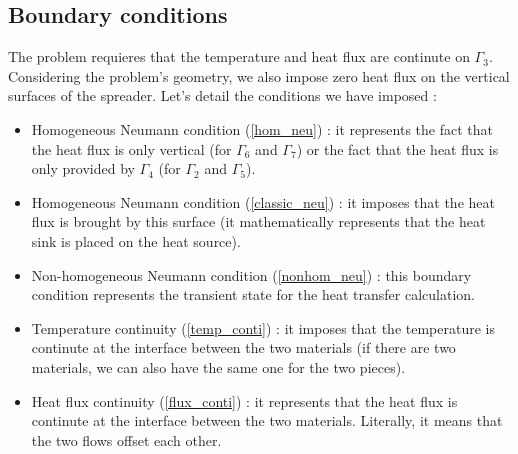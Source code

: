 %


\subsection{Boundary conditions}
\label{heat:bc}
The problem requieres that the temperature and heat flux are continute on $\Gamma_3$. Considering the problem's geometry, we also impose zero heat flux on the vertical surfaces of the spreader. Let's detail the conditions we have imposed :
\begin{itemize}
\item Homogeneous Neumann condition (\ref{hom_neu}) : it represents the fact that the heat flux is only vertical (for $\Gamma_6$ and $\Gamma_7$) or the fact that the heat flux is only provided by $\Gamma_4$ (for $\Gamma_2$ and $\Gamma_5$).

\item Homogeneous Neumann condition (\ref{classic_neu}) : it imposes that the heat flux is brought by this surface (it mathematically represents that the heat sink is placed on the heat source).

\item Non-homogeneous Neumann condition (\ref{nonhom_neu}) :  this boundary condition represents the transient state for the heat transfer calculation.

\item Temperature continuity (\ref{temp_conti}) : it imposes that the temperature is continute at the interface between the two materials (if there are two materials, we can also have the same one for the two pieces).

\item Heat flux continuity (\ref{flux_conti}) : it represents that the heat flux is continute at the interface between the two materials. Literally, it means that the two flows offset each other.

\end{itemize}

